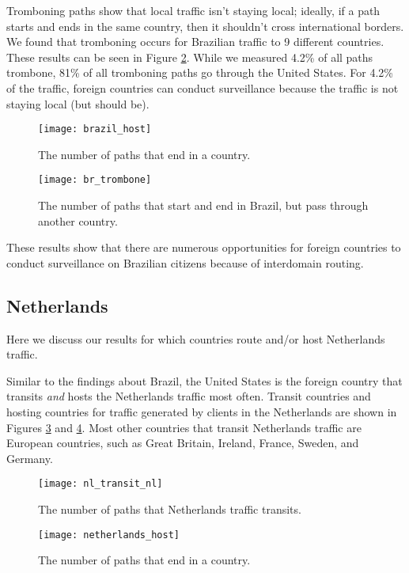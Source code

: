 Tromboning paths show that local traffic isn't staying local; ideally, if a path starts and ends in the same country, then it shouldn't cross international borders.  We found that tromboning occurs for Brazilian traffic to 9 different countries.  These results can be seen in Figure \ref{fig:trombone_br}.  While we measured 4.2\% of all paths trombone, 81\% of all tromboning paths go through the United States.  For 4.2\% of the traffic, foreign countries can conduct surveillance because the traffic is not staying local (but should be). 

\begin{figure}[t!]
\centering
\texttt{[image: brazil\_host]}
\caption{The number of paths that end in a country.}
\label{fig:host_br}
\end{figure} 

\begin{figure}
\centering
\texttt{[image: br\_trombone]}
\caption{The number of paths that start and end in Brazil, but pass through another country.}
\label{fig:trombone_br}
\end{figure}

These results show that there are numerous opportunities for foreign countries to conduct surveillance on Brazilian citizens because of interdomain routing. 

\subsection{Netherlands}
Here we discuss our results for which countries route and/or host Netherlands traffic. 

Similar to the findings about Brazil, the United States is the foreign country that transits {\it and} hosts the Netherlands traffic most often.  Transit countries and hosting countries for traffic generated by clients in the Netherlands are shown in Figures \ref{fig:transit_nl} and \ref{fig:host_nl}.  Most other countries that transit Netherlands traffic are European countries, such as Great Britain, Ireland, France, Sweden, and Germany.

\begin{figure}
\centering
\texttt{[image: nl\_transit\_nl]}
\caption{The number of paths that Netherlands traffic transits.}
\label{fig:transit_nl}
\end{figure}

\begin{figure}[t!]
\centering
\texttt{[image: netherlands\_host]}
\caption{The number of paths that end in a country.}
\label{fig:host_nl}
\end{figure} 

